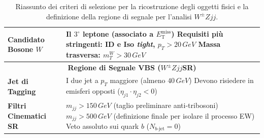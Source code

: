 \documentclass[11pt]{article}
\newcommand{\wzjj}{$W^\pm Z jj$}
\begin{document}
\begin{table}[htbp]
\begin{tabular}{p{4.5cm} p{10cm}}
\hline
\textbf{Candidato Bosone $W$} & Il $3^\circ$ leptone (associato a $E_{\mathrm{T}}^{\mathrm{miss}}$) \newline
Requisiti più stringenti: ID e Iso \textit{tight}, $p_T > 20\,\unit{GeV}$ \newline
Massa trasversa: $m_T^W > 30\,\unit{GeV}$ \\
\hline
\multicolumn{2}{c}{\textbf{Regione di Segnale VBS (\wzjj SR)}} \\
\hline
\textbf{Jet di Tagging} & I due jet a $p_T$ maggiore (almeno $40\,\unit{GeV}$) \newline
Devono risiedere in emisferi opposti ($\eta_{j1} \cdot \eta_{j2} < 0$) \\
\hline
\textbf{Filtri Cinematici SR} & $m_{jj} > 150\,\unit{GeV}$ (taglio preliminare anti-tribosoni) \newline
$m_{jj} > 500\,\unit{GeV}$ (definizione finale per isolare il processo EW) \newline
Veto assoluto sui quark $b$ ($N_{b\text{-jet}} = 0$) \\
\hline
\end{tabular}
\caption{Riassunto dei criteri di selezione per la ricostruzione degli oggetti fisici e la definizione della regione di segnale per l'analisi $W^\pm Zjj$.}
\label{tab:event_selection}
\end{table}
\end{document}
